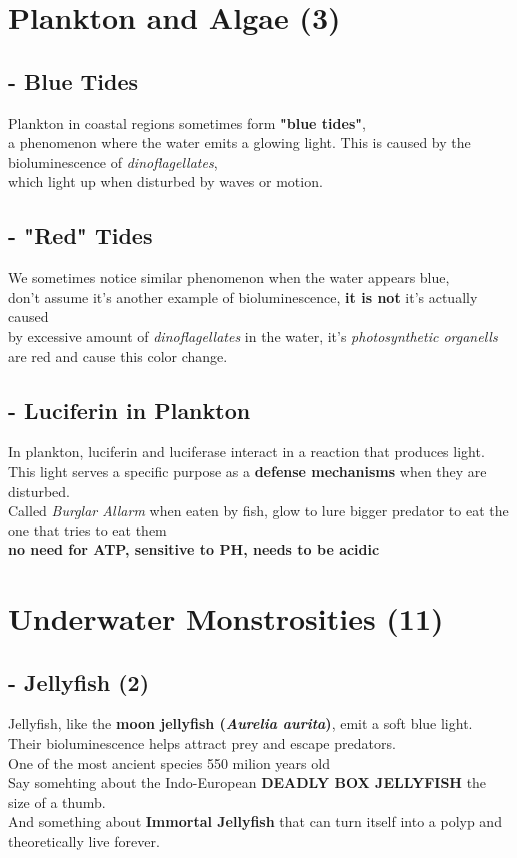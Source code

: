 \documentclass{article}
\begin{document}
\section*{Plankton and Algae (3)}

\subsection*{- Blue Tides }
Plankton in coastal regions sometimes form \textbf{"blue tides"},\\ 
a phenomenon where the water emits a glowing light. This is caused by the bioluminescence of \textit{dinoflagellates}, \\
which light up when disturbed by waves or motion.

\subsection*{- "Red" Tides }
We sometimes notice similar phenomenon when the water appears blue,\\
don't assume it's another example of bioluminescence, \textbf{it is not} it's actually caused\\
by excessive amount of \textit{dinoflagellates} in the water, it's \textit{photosynthetic organells} are red and cause this color change.

\subsection*{- Luciferin in Plankton }
In plankton, luciferin and luciferase interact in a reaction that produces light.\\ 
This light serves a specific purpose as a \textbf{defense mechanisms} when they are disturbed.\\
Called \textit{Burglar Allarm} when eaten by fish, glow to lure bigger predator to eat the one that tries to eat them\\
\textbf{no need for ATP, sensitive to PH, needs to be acidic}



\section*{Underwater Monstrosities (11)}

\subsection*{- Jellyfish (2)}
Jellyfish, like the \textbf{moon jellyfish (\textit{Aurelia aurita})}, emit a soft blue light.\\ 
Their bioluminescence helps attract prey and escape predators.\\
One of the most ancient species 550 milion years old\\
Say somehting about the Indo-European \textbf{DEADLY BOX JELLYFISH} the size of a thumb.\\
And something about \textbf{Immortal Jellyfish} that can turn itself into a polyp and  theoretically live forever.
\end{document}
